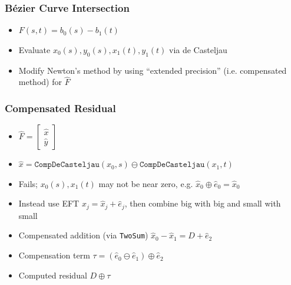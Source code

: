 \documentclass{beamer}
\begin{document}
\begin{frame}
\frametitle{B\'{e}zier Curve Intersection}
\begin{itemize}
\item \(F(s, t) = b_0(s) - b_1(t)\)
\pause
\item Evaluate \(x_0(s), y_0(s), x_1(t), y_1(t)\) via de Casteljau
\pause
\item Modify Newton's method by using ``extended precision'' (i.e.
  compensated method) for \(\widehat{F}\)
\end{itemize}
\end{frame}

\begin{frame}
\frametitle{Compensated Residual}
\begin{itemize}
\item \(\widehat{F} = \left[ \begin{array}{c} \widehat{x} \\
    \widehat{y} \end{array}\right]\)
\pause
\item \(\widehat{x} = \mathtt{CompDeCasteljau}\left(x_0, s\right) \ominus
  \mathtt{CompDeCasteljau}\left(x_1, t\right)\)
\pause
\item Fails; \(x_0(s), x_1(t)\) may not be near zero, e.g.
  \(\widehat{x}_0 \oplus \widehat{e}_0 = \widehat{x}_0\)
\pause
\item Instead use EFT \(x_j = \widehat{x}_j + \widehat{e}_j\), then
  combine big with big and small with small
\pause
\item Compensated addition (via \texttt{TwoSum})
  \(\widehat{x}_0 - \widehat{x}_1 = D + \widehat{e}_2\)
\pause
\item Compensation term \(\tau = \left(\widehat{e}_0 \ominus
  \widehat{e}_1\right) \oplus \widehat{e}_2\)
\pause
\item Computed residual \(D \oplus \tau\)
\end{itemize}
\end{frame}
\end{document}
